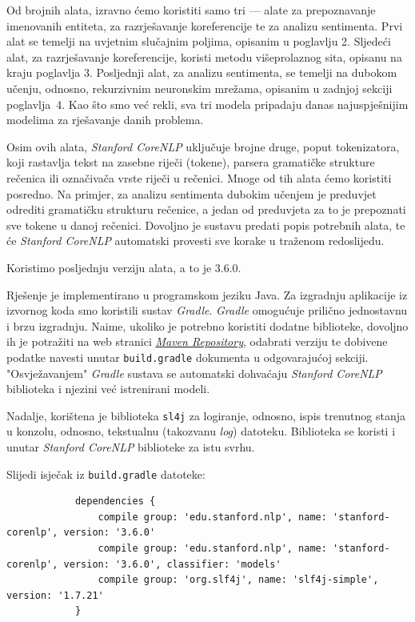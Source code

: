 \documentclass[a4paper,twoside,12pt]{memoir} %
\newcommand{\ti}[1]{\textit{#1\/}}
\begin{document}
		Od brojnih alata, izravno ćemo koristiti samo tri --- alate za prepoznavanje imenovanih entiteta, za razrješavanje koreferencije te za analizu sentimenta. Prvi alat se temelji na uvjetnim slučajnim poljima, opisanim u poglavlju 2. Sljedeći alat, za razrješavanje koreferencije, koristi metodu višeprolaznog sita, opisanu na kraju poglavlja 3. Posljednji alat, za analizu sentimenta, se temelji na dubokom učenju, odnosno, rekurzivnim neuronskim mrežama, opisanim u zadnjoj sekciji poglavlja~4. Kao što smo već rekli, sva tri modela pripadaju danas najuspješnijim modelima za rješavanje danih problema.

		Osim ovih alata, \ti{Stanford CoreNLP} uključuje brojne druge, poput tokenizatora, koji rastavlja tekst na zasebne riječi (tokene), parsera gramatičke strukture rečenica ili označivača vrste riječi u rečenici. Mnoge od tih alata ćemo koristiti posredno. Na primjer, za analizu sentimenta dubokim učenjem je preduvjet odrediti gramatičku strukturu rečenice, a jedan od preduvjeta za to je prepoznati sve tokene u danoj rečenici. Dovoljno je sustavu predati popis potrebnih alata, te će \ti{Stanford CoreNLP} automatski provesti sve korake u traženom redoslijedu.

		Koristimo posljednju verziju alata, a to je 3.6.0.

		\bigskip

		Rješenje je implementirano u programskom jeziku Java. Za izgradnju aplikacije iz izvornog koda smo koristili sustav \ti{Gradle}. \ti{Gradle} omogućuje prilično jednostavnu i brzu izgradnju. Naime, ukoliko je potrebno koristiti dodatne biblioteke, dovoljno ih je potražiti na web stranici \href{http://mvnrepository.com/}{\ti{Maven Repository}}, odabrati verziju te dobivene podatke navesti unutar \texttt{build.gradle} dokumenta u odgovarajućoj sekciji. "Osvježavanjem" \ti{Gradle} sustava se automatski dohvaćaju \ti{Stanford CoreNLP} biblioteka i njezini već istrenirani modeli.

		Nadalje, korištena je biblioteka \texttt{sl4j} za logiranje, odnosno, ispis trenutnog stanja u konzolu, odnosno, tekstualnu (takozvanu \ti{log}) datoteku. Biblioteka se koristi i unutar \ti{Stanford CoreNLP} biblioteke za istu svrhu.

		Slijedi isječak iz \texttt{build.gradle} datoteke:

		\begin{lstlisting}
			dependencies {
				compile group: 'edu.stanford.nlp', name: 'stanford-corenlp', version: '3.6.0'
				compile group: 'edu.stanford.nlp', name: 'stanford-corenlp', version: '3.6.0', classifier: 'models'
			    compile group: 'org.slf4j', name: 'slf4j-simple', version: '1.7.21'
			}
		\end{lstlisting}
\end{document}
